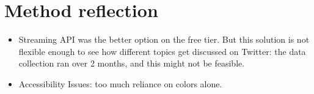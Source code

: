 \section{Method reflection}
\begin{itemize}
    \item Streaming API was the better option on the free tier. But this solution is not flexible enough to see how different topics get discussed on Twitter: the data collection ran over 2 months, and this might not be feasible.
    \item Accessibility Issues: too much reliance on colors alone.
\end{itemize}